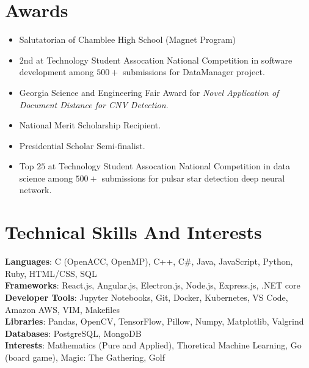 \documentclass[letterpaper,10pt]{article}
\newcommand{\resumeItem}[1]{

  \item[$\circ$]\small{
    {#1 \vspace{-2pt}}
  }
}
\newcommand{\resumeItemListStart}{\begin{itemize}[rightmargin=1.9cm]}
\newcommand{\resumeItemListEnd}{\end{itemize}\vspace{-5pt}}
\begin{document}
\section{Awards}
\resumeItemListStart
\resumeItem{Salutatorian of Chamblee High School (Magnet Program)}
\vspace{-5pt}
\resumeItem{$2$nd at Technology Student Assocation National Competition in software development among $500+$ submissions for DataManager project.}
\vspace{-5pt}
\resumeItem{Georgia Science and Engineering Fair Award for \textit{Novel Application of Document Distance for CNV Detection}.}
\vspace{-5pt}
\resumeItem{National Merit Scholarship Recipient.}
\vspace{-5pt}
\resumeItem{Presidential Scholar Semi-finalist.}
\vspace{-5pt}
\resumeItem{Top $25$ at Technology Student Assocation National Competition in data science among $500+$ submissions for pulsar star detection deep neural network.}
\vspace{-5pt}\resumeItemListEnd

\section{Technical Skills And Interests}
\begin{itemize}[leftmargin=0.15in, label={}]
  \small{\item{
                \textbf{Languages}{: C (OpenACC, OpenMP), C++, C\#, Java, JavaScript, Python, Ruby, HTML/CSS, SQL}\\
                \textbf{Frameworks}{: React.js, Angular.js, Electron.js, Node.js, Express.js, .NET core} \\
                \textbf{Developer Tools}{: Jupyter Notebooks, Git, Docker, Kubernetes, VS Code, Amazon AWS, VIM, Makefiles} \\
                \textbf{Libraries}{: Pandas, OpenCV, TensorFlow, Pillow, Numpy, Matplotlib, Valgrind}\\
                \textbf{Databases}{: PostgreSQL, MongoDB}\\
                \textbf{Interests}{: Mathematics (Pure and Applied), Thoretical Machine Learning, Go (board game), Magic: The Gathering, Golf\\
                }}}
\end{itemize}
\end{document}
